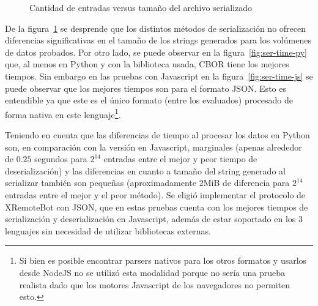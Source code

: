 \begin{figure}
    \centering
    \begin{framed}
    \end{framed}
    \caption{Cantidad de entradas versus tamaño del archivo serializado}
    \label{fig:ser-size}
\end{figure}

De la figura~\ref{fig:ser-size} se desprende que los distintos métodos de
serialización no ofrecen diferencias significativas en el tamaño de los
strings generados para los volúmenes de datos probados. Por otro lado,
se puede observar en la figura~\ref{fig:ser-time-py} que, al menos en
Python y con la biblioteca usada, CBOR tiene los mejores tiempos. Sin
embargo en las pruebas con Javascript en la figura~\ref{fig:ser-time-js}
se puede observar que los mejores tiempos son para el formato JSON.
Esto es entendible ya que este es el único formato (entre los evaluados) procesado de forma
nativa en este lenguaje\footnote{Si bien es posible encontrar parsers nativos para los
otros formatos y usarlos desde NodeJS no se utilizó esta modalidad porque
no sería una prueba realista dado que los motores Javascript de los
navegadores no permiten esto.}.

Teniendo en cuenta que las diferencias de tiempo al procesar los datos
en Python son, en comparación con la versión en Javascript, marginales
(apenas alrededor de $0.25$ segundos para $2^{14}$
entradas entre el mejor y peor tiempo de deserialización) y las diferencias
en cuanto a tamaño del string generado al
serializar también son pequeñas (aproximadamente 2MiB de diferencia para
$2^{14}$ entradas entre el mejor y el peor método). Se eligió implementar
el protocolo de XRemoteBot con JSON, que en estas pruebas cuenta con los
mejores tiempos de serialización y deserialización en Javascript, además
de estar soportado en los 3 lenguajes sin necesidad de utilizar bibliotecas
externas.


